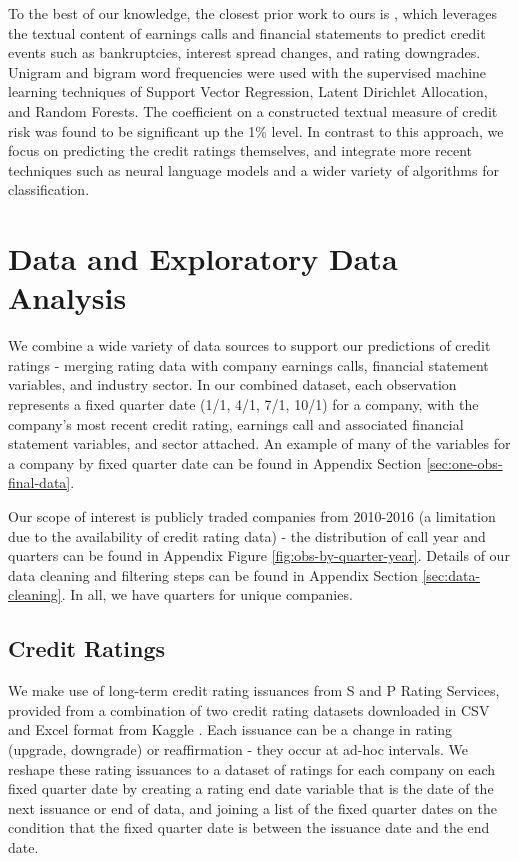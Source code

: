 \documentclass{article}[11pt]
\begin{document}
    To the best of our knowledge, the closest prior work to ours is \cite{donovan_measuring_2021}, which leverages the textual content of earnings calls and financial statements to predict credit events such as bankruptcies, interest spread changes, and rating downgrades. Unigram and bigram word frequencies were used with the supervised machine learning techniques of Support Vector Regression, Latent Dirichlet Allocation, and Random Forests. The coefficient on a constructed textual measure of credit risk was found to be significant up the 1\% level. In contrast to this approach, we focus on predicting the credit ratings themselves, and integrate more recent techniques such as neural language models and a wider variety of algorithms for classification.

    \section*{Data and Exploratory Data Analysis}

    We combine a wide variety of data sources to support our predictions of credit ratings - merging rating data with company earnings calls, financial statement variables, and industry sector. In our combined dataset, each observation represents a fixed quarter date (1/1, 4/1, 7/1, 10/1) for a company, with the company's most recent credit rating, earnings call and associated financial statement variables, and sector attached. An example of many of the variables for a company by fixed quarter date can be found in Appendix Section \ref{sec:one-obs-final-data}.

    Our scope of interest is publicly traded companies from 2010-2016 (a limitation due to the availability of credit rating data) - the distribution of call year and quarters can be found in Appendix Figure \ref{fig:obs-by-quarter-year}. Details of our data cleaning and filtering steps can be found in Appendix Section \ref{sec:data-cleaning}. In all, we have \numQuarters \space quarters for \numCompanies \space unique companies.

    \subsection*{Credit Ratings}

    We make use of long-term credit rating issuances from S and P Rating Services, provided from a combination of two credit rating datasets downloaded in CSV and Excel format from Kaggle \citep{gewerc_corporate_2020,makwana_corporate_2022}. Each issuance can be a change in rating (upgrade, downgrade) or reaffirmation - they occur at ad-hoc intervals. We reshape these rating issuances to a dataset of ratings for each company on each fixed quarter date by creating a rating end date variable that is the date of the next issuance or end of data, and joining a list of the fixed quarter dates on the condition that the fixed quarter date is between the issuance date and the end date.
\end{document}

